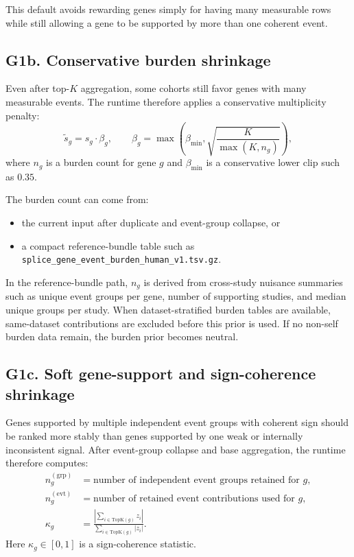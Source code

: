\documentclass[11pt]{article}
\begin{document}
This default avoids rewarding genes simply for having many measurable rows while still allowing a gene to be supported by more than one coherent event.

\subsection{G1b. Conservative burden shrinkage}
Even after top-$K$ aggregation, some cohorts still favor genes with many measurable events. The runtime therefore applies a conservative multiplicity penalty:
\[
\widetilde{s}_g = s_g \cdot \beta_g,
\qquad
\beta_g = \max\!\left(\beta_{\min}, \sqrt{\frac{K}{\max(K, n_g)}}\right),
\]
where $n_g$ is a burden count for gene $g$ and $\beta_{\min}$ is a conservative lower clip such as $0.35$.

The burden count can come from:
\begin{itemize}[leftmargin=2em]
\item the current input after duplicate and event-group collapse, or
\item a compact reference-bundle table such as \texttt{splice\_gene\_event\_burden\_human\_v1.tsv.gz}.
\end{itemize}

In the reference-bundle path, $n_g$ is derived from cross-study nuisance summaries such as unique event groups per gene, number of supporting studies, and median unique groups per study. When dataset-stratified burden tables are available, same-dataset contributions are excluded before this prior is used. If no non-self burden data remain, the burden prior becomes neutral.

\subsection{G1c. Soft gene-support and sign-coherence shrinkage}
Genes supported by multiple independent event groups with coherent sign should be ranked more stably than genes supported by one weak or internally inconsistent signal. After event-group collapse and base aggregation, the runtime therefore computes:
\begin{align}
n_g^{(\mathrm{grp})} &= \text{number of independent event groups retained for } g,\\
n_g^{(\mathrm{evt})} &= \text{number of retained event contributions used for } g,\\
\kappa_g &= \frac{\left|\sum_{i \in \mathrm{TopK}(g)} z_i\right|}{\sum_{i \in \mathrm{TopK}(g)} |z_i|}.
\end{align}
Here $\kappa_g \in [0,1]$ is a sign-coherence statistic.
\end{document}
